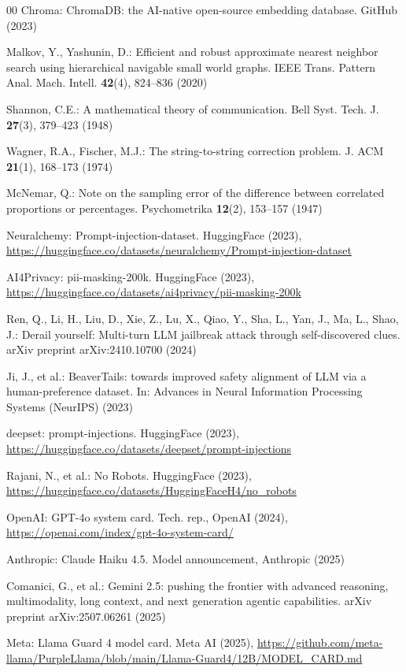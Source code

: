 \documentclass[runningheads]{llncs}
\newif\ifrev
\newcommand{\rev}[1]{\ifrev\hl{#1}\else#1\fi}                  %
\begin{document}
\begin{thebibliography}{00}
Chroma: ChromaDB: the AI-native open-source embedding database. GitHub (2023)

Malkov, Y., Yashunin, D.: Efficient and robust approximate nearest neighbor search using hierarchical navigable small world graphs. IEEE Trans. Pattern Anal. Mach. Intell. \textbf{42}(4), 824--836 (2020)

Shannon, C.E.: A mathematical theory of communication. Bell Syst. Tech. J. \textbf{27}(3), 379--423 (1948)

Wagner, R.A., Fischer, M.J.: The string-to-string correction problem. J. ACM \textbf{21}(1), 168--173 (1974)

McNemar, Q.: Note on the sampling error of the difference between correlated proportions or percentages. Psychometrika \textbf{12}(2), 153--157 (1947)

Neuralchemy: Prompt-injection-dataset. HuggingFace (2023), \url{https://huggingface.co/datasets/neuralchemy/Prompt-injection-dataset}

AI4Privacy: pii-masking-200k. HuggingFace (2023), \url{https://huggingface.co/datasets/ai4privacy/pii-masking-200k}

\rev{Ren, Q., Li, H., Liu, D., Xie, Z., Lu, X., Qiao, Y., Sha, L., Yan, J., Ma, L., Shao, J.: Derail yourself: Multi-turn LLM jailbreak attack through self-discovered clues. arXiv preprint arXiv:2410.10700 (2024)}

Ji, J., et al.: BeaverTails: towards improved safety alignment of LLM via a human-preference dataset. In: Advances in Neural Information Processing Systems (NeurIPS) (2023)

deepset: prompt-injections. HuggingFace (2023), \url{https://huggingface.co/datasets/deepset/prompt-injections}

Rajani, N., et al.: No Robots. HuggingFace (2023), \url{https://huggingface.co/datasets/HuggingFaceH4/no_robots}

OpenAI: GPT-4o system card. Tech. rep., OpenAI (2024), \url{https://openai.com/index/gpt-4o-system-card/}

Anthropic: Claude Haiku 4.5. Model announcement, Anthropic (2025)

Comanici, G., et al.: Gemini 2.5: pushing the frontier with advanced reasoning, multimodality, long context, and next generation agentic capabilities. arXiv preprint arXiv:2507.06261 (2025)

Meta: Llama Guard 4 model card. Meta AI (2025), \url{https://github.com/meta-llama/PurpleLlama/blob/main/Llama-Guard4/12B/MODEL_CARD.md}


\end{thebibliography}
\end{document}
